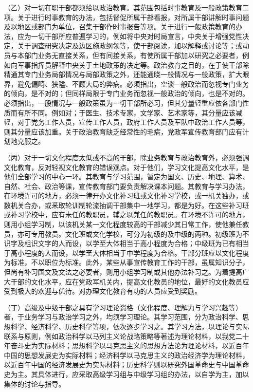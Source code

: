 （乙）对一切在职干部都须给以政治教育。其范围包括时事教育及一般政策教育二项。关于进行时事教育的办法，包括督促所属干部看报，对所属干部讲解时事问题及以地区或部门为单位，召集干部作时事报告等项。关于进行一般政策教育的办法，应为一切干部所应普遍学习的，例如将中央对时局宣言，中央关于增强党性决定，关于调查研究决定及边区施政纲领等，使干部阅读，加以解释或讨论等；或动员与本部门业务无直接关系，但有间接关系，有使所属干部加以研究之必要者，例如向军事指挥员解释中央关于土地政策的决定等。政治教育之目的，在于使干部除精通其专门业务局部情况与局部政策之外，还能通晓一般情况与一般政策，扩大眼界，避免偏畸、狭隘、不顾大局的弊病。必须指出，空谈一般政治而忽视专门业务的倾向，是不对的；但同样局限于专门业务而忽视一般政治的倾向，也是不对的。必须指出，一股情况与一般政策虽为一切干部所必习，但其分量轻重应依各部门性质而有所不同。例如对；于医生、技术专家，文学家、艺术家等，其分量应该减轻，对于党务工作人员，宣传工作人员，政府工作人员及军队中政治工作人员等，则其分量应该加重。关于政治教育缺乏经常性的毛病，党政军宣传教育部门应有计划地克服之。

（丙）对于一切文化程度太低或不高的干部，除业务教育与政治教育外，必须强调文化教育，反对轻视文化教育的错误观点。对于他们，学习文化提高文化水平，是他们全部学习的中心一环。其教育与学习范围，暂定为国文、历史、地理、算术、自然、社会、政治等课，宣传教育部门要负责解决课本问题。其教育与学习办法，在环境许可的地方，必须一律开办文化补习班或文化补习学校，或一机关独办，或数机关合办，或釆取轮训制轮流抽调干部集中一地学习，都是为好。在这些补习班或补习学校中，应有未任的教职员，辅之以兼任的教职员。在环境不许可的地方，则用小组学习制，以该机关某一文化程度较高的干部减少其日常工作，使他兼任教员，亦可专用教员。文化班或文化学校，可分为初级的及中级的两种。初级班为不识字及粗识文字的人而设，以学至大体相当于高小程度为合格；中级班为已有相当于高小程度的人而设，以学至大体相当于中学程度为合格。干部分班应以文化程度为标准，不以职位为标准。此外，某些从事宣传教育工作的干部，虽属知识分子，但尚有补习国文及文法之必要者，则用小组学习制或其他办法补习之。为着提高广大干部的文化水平，应在党政军机关内，提高文化教员的地位，最好的文化教员应受到极大的欢迎与优待。对办理文化教育有功的人员应受到奖励。

（丁）高级及中级干部之具有学习理论资格（文化程度、理解力与学习兴趣等）者，于业务学习与政治学习之外，均须学习理论。其学习范围，分为政治科学、思想科学、经济科学、历史科学等项，依次逐步学习之。其学习方法，以理论与实际联系与原则，例如政治科学以马列主义论战略策略等著述为理论材料，以我党二十年奋斗史为实际材料；思想科学以马克思主义的思想方法论为理论材料，以近百年中国的思想发展史为实际材料；经济科学以马克思主义的政治经济学为理论材料，以近百年中国的经济发展史为实际材料；历史科学则以研究外国革命史与中国革命史为主。其具体进行，应采取高级学习组与中级学习组的办法，以自学为主，加以集体的讨论与指导。

